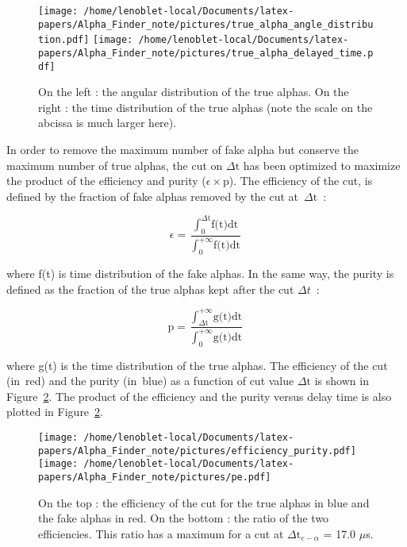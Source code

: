 \documentclass[main.tex]{subfiles}
\begin{document}
\begin{figure}[h!]
\begin{center}
\texttt{[image: /home/lenoblet-local/Documents/latex-papers/Alpha\_Finder\_note/pictures/true\_alpha\_angle\_distribution.pdf]}
\texttt{[image: /home/lenoblet-local/Documents/latex-papers/Alpha\_Finder\_note/pictures/true\_alpha\_delayed\_time.pdf]}
\caption{On the left : the angular distribution of the true alphas. On the right : the time distribution of the true alphas (note the scale on the abcissa is much larger here).}
\label{trueAlphadistribution}
\end{center}
\end{figure}


\noindent In order to remove the maximum number of fake alpha but conserve the maximum number of true alphas, the cut on $\Delta \text{t}$ has been optimized to maximize the product of the efficiency and purity ($\epsilon \times \text{p}$). The efficiency of the cut, is defined by the fraction of fake alphas removed by the cut at~$\Delta \text{t}$~:


\begin{equation}
\epsilon = \frac{ \displaystyle{\int_0^{\Delta \text{t}}} \text{f(t)} \text{dt} } { \displaystyle{\int_\text{0}^{+\infty}} \text{f(t)} \text{dt}} 
\end{equation}


\noindent where f(t) is time distribution of the fake alphas. In the same way, the purity is defined as the fraction of the true alphas kept after the cut $\Delta t$~:

\begin{equation}
\text{p} = \frac{ \displaystyle{\int_{\Delta \text{t}}^{+\infty}} \text{g(t)} \text{dt} } { \displaystyle{\int_\text{0}^{+\infty}} \text{g(t)} \text{dt}} 
\end{equation}

\noindent where g(t) is the time distribution of the true alphas. The efficiency of the cut (in~red) and the purity (in~blue) as a function of cut value $\Delta \text{t}$ is shown in Figure~\ref{efficiency_ratio}. The product of the efficiency and the purity versus delay time is also plotted in Figure~\ref{efficiency_ratio}.


\begin{figure}[h!]
\begin{center}
\texttt{[image: /home/lenoblet-local/Documents/latex-papers/Alpha\_Finder\_note/pictures/efficiency\_purity.pdf]}
\texttt{[image: /home/lenoblet-local/Documents/latex-papers/Alpha\_Finder\_note/pictures/pe.pdf]}
\caption{On the top : the efficiency of the cut for the true alphas in blue and the fake alphas in red. On the bottom : the ratio of the two efficiencies. This ratio has a maximum for a cut at $\Delta \text{t}_{e-\alpha}$ = 17.0 $\mu$s.}
\label{efficiency_ratio}
\end{center}
\end{figure}
\end{document}
